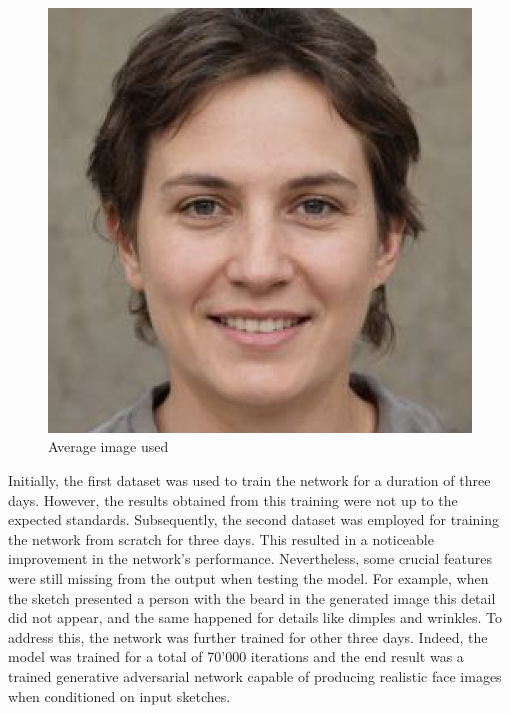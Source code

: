 \begin{figure}[htbp]
\centering
  \includegraphics[scale=0.2]{figures/avg_image.png}
  \caption{Average image used}
  \label{fig:Average image}
\end{figure}

\noindent Initially, the first dataset was used to train the network for a duration of three days. However, the results obtained from this training were not up to the expected standards. Subsequently, the second dataset was employed for training the network from scratch for three days. This resulted in a noticeable improvement in the network's performance. Nevertheless, some crucial features were still missing from the output when testing the model. For example, when the sketch presented a person with the beard in the generated image this detail did not appear, and the same happened for details like dimples and wrinkles. To address this, the network was further trained for other three days. Indeed, the model was trained for a total of 70'000 iterations and the end result was a trained generative adversarial network capable of producing realistic face images when conditioned on input sketches.


